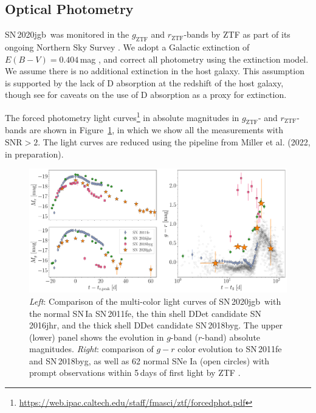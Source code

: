 \documentclass[twocolumn]{aastex631}
\newcommand{\sn}{SN\,2020jgb}
\newcommand{\chang}[1]{\textcolor{blue}{[Chang: #1]}}
\begin{document}
\subsection{Optical Photometry}
\sn\ was monitored in the $g_\mathrm{ZTF}$ and $r_\mathrm{ZTF}$-bands by ZTF as part of its ongoing Northern Sky Survey \citep{ZTF2019a}. %
We adopt a Galactic extinction of $E(B-V)=0.404\,$mag \citep{Schlafly2011}, and correct all photometry using the \citet{Fitzpatrick1999} extinction model. We assume there is no additional extinction in the host galaxy. This assumption is supported by the lack of  D absorption at the redshift of the host galaxy, though see \citet{Poznanski_2011} for caveats on the use of  D absorption as a proxy for extinction. 

The forced photometry light curves\footnote{\url{https://web.ipac.caltech.edu/staff/fmasci/ztf/forcedphot.pdf}} in absolute magnitudes in $g_\mathrm{ZTF}$- and $r_\mathrm{ZTF}$-bands are shown in Figure~\ref{fig:photometry}, in which we show all the measurements with $\mathrm{SNR}>2$. The light curves are reduced using the pipeline from Miller et al. (2022, in preparation). %

\begin{figure}
    \centering
    \includegraphics[width=\textwidth]{photometry.pdf}
    \caption{\textit{Left}: Comparison of the multi-color light curves  of \sn\ with the normal SN\,Ia SN\,2011fe, the thin shell DDet candidate SN\,2016jhr, and the thick shell DDet candidate SN\,2018byg. The upper (lower) panel shows the evolution in $g$-band ($r$-band) absolute magnitudes. \textit{Right}: comparison of $g-r$ color evolution to SN\,2011fe and SN\,2018byg, as well as 62 normal SNe Ia (open circles) with prompt observations within 5\,days of first light by ZTF \citep{Bulla2020}.}
    \label{fig:photometry}
\end{figure}
\end{document}
